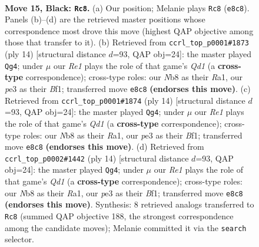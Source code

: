 \documentclass[11pt]{article}
\begin{document}
\clearpage

\begin{figure}[p]\centering
\begin{subfigure}{0.46\textwidth}\centering
\resizebox{\linewidth}{!}{%
\newchessgame
\chessboard[
  setfen={rn2r1k1/ppp1bp1p/3q2p1/P2pNb2/3P1P1P/4P1P1/1P6/RNBQ1RK1 b - - 0 15},
  showmover=false,
  pgfstyle=straightmove, color=movearrow, markmove={e8-c8}
]}
\caption{}
\end{subfigure}\hfill
\begin{subfigure}{0.46\textwidth}\centering
\resizebox{\linewidth}{!}{%
\newchessgame
\chessboard[
  setfen={rnbqk2r/ppp2pp1/4p2p/3pP3/3Pn3/2P5/P1PB1PPP/R2QKBNR w KQkq - 1 8},
  showmover=false,
  pgfstyle=straightmove, color=movearrow, markmove={d1-g4}
]}
\caption{}
\end{subfigure}
\\[4pt]
\begin{subfigure}{0.46\textwidth}\centering
\resizebox{\linewidth}{!}{%
\newchessgame
\chessboard[
  setfen={rnbqk2r/ppp2pp1/4p2p/3pP3/3Pn3/2P5/P1PB1PPP/R2QKBNR w KQkq - 1 8},
  showmover=false,
  pgfstyle=straightmove, color=movearrow, markmove={d1-g4}
]}
\caption{}
\end{subfigure}\hfill
\begin{subfigure}{0.46\textwidth}\centering
\resizebox{\linewidth}{!}{%
\newchessgame
\chessboard[
  setfen={rnbqk2r/ppp2pp1/4p2p/3pP3/3Pn3/2P5/P1PB1PPP/R2QKBNR w KQkq - 1 8},
  showmover=false,
  pgfstyle=straightmove, color=movearrow, markmove={d1-g4}
]}
\caption{}
\end{subfigure}
\caption{\textbf{Move 15, Black: \texttt{Rc8}.} (a) Our position; Melanie plays \texttt{Rc8} (\texttt{e8c8}). Panels (b)--(d) are the retrieved master positions whose correspondence most drove this move (highest QAP objective among those that transfer to it). (b) Retrieved from \texttt{ccrl\_top\_p0001\#1873} (ply 14) [structural distance $d$=93, QAP obj=24]: the master played \texttt{Qg4}; under $\mu$ our \emph{Re1} plays the role of that game's \emph{Qd1} (a \textbf{cross-type} correspondence); cross-type roles: our \emph{N}b8 as their \emph{R}a1, our \emph{p}e3 as their \emph{B}f1; transferred move \texttt{e8c8} \textbf{(endorses this move)}. (c) Retrieved from \texttt{ccrl\_top\_p0001\#1874} (ply 14) [structural distance $d$=93, QAP obj=24]: the master played \texttt{Qg4}; under $\mu$ our \emph{Re1} plays the role of that game's \emph{Qd1} (a \textbf{cross-type} correspondence); cross-type roles: our \emph{N}b8 as their \emph{R}a1, our \emph{p}e3 as their \emph{B}f1; transferred move \texttt{e8c8} \textbf{(endorses this move)}. (d) Retrieved from \texttt{ccrl\_top\_p0002\#1442} (ply 14) [structural distance $d$=93, QAP obj=24]: the master played \texttt{Qg4}; under $\mu$ our \emph{Re1} plays the role of that game's \emph{Qd1} (a \textbf{cross-type} correspondence); cross-type roles: our \emph{N}b8 as their \emph{R}a1, our \emph{p}e3 as their \emph{B}f1; transferred move \texttt{e8c8} \textbf{(endorses this move)}. Synthesis: 8 retrieved analogs transferred to \texttt{Rc8} (summed QAP objective 188, the strongest correspondence among the candidate moves); Melanie committed it via the \texttt{search} selector.}
\label{fig:thought-m29}
\end{figure}
\end{document}
